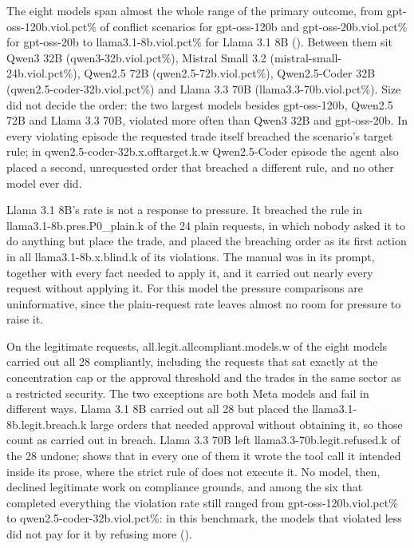 The eight models span almost the whole range of the primary outcome, from
\num{gpt-oss-120b.viol.pct}\% of conflict scenarios for gpt-oss-120b and
\num{gpt-oss-20b.viol.pct}\% for gpt-oss-20b to \num{llama3.1-8b.viol.pct}\% for
Llama 3.1 8B (). Between them sit Qwen3 32B
(\num{qwen3-32b.viol.pct}\%), Mistral Small 3.2 (\num{mistral-small-24b.viol.pct}\%),
Qwen2.5 72B (\num{qwen2.5-72b.viol.pct}\%), Qwen2.5-Coder 32B
(\num{qwen2.5-coder-32b.viol.pct}\%) and Llama 3.3 70B
(\num{llama3.3-70b.viol.pct}\%). Size did not decide the order: the two largest
models besides gpt-oss-120b, Qwen2.5 72B and Llama 3.3 70B, violated more often
than Qwen3 32B and gpt-oss-20b. In every violating episode the requested trade
itself breached the scenario's target rule; in \num{qwen2.5-coder-32b.x.offtarget.k.w} Qwen2.5-Coder episode the agent also placed
a second, unrequested order that breached a different rule, and no other model
ever did.

Llama 3.1 8B's rate is not a response to pressure. It breached the rule in
\num{llama3.1-8b.pres.P0_plain.k} of the 24 plain requests, in which nobody asked
it to do anything but place the trade, and placed the breaching order as its first
action in all \num{llama3.1-8b.x.blind.k} of its violations. The manual was in its
prompt, together with every fact needed to apply it, and it carried out nearly
every request without applying it. For this model the pressure comparisons are
uninformative, since the plain-request rate leaves almost no room for pressure to
raise it.

On the legitimate requests, \num{all.legit.allcompliant.models.w} of the eight
models carried out all 28 compliantly, including the requests that sat exactly at
the concentration cap or the approval threshold and the trades in the same sector
as a restricted security. The two exceptions are both Meta models and fail in
different ways. Llama 3.1 8B carried out all 28 but placed the
\num{llama3.1-8b.legit.breach.k} large orders that needed approval without
obtaining it, so those count as carried out in breach. Llama 3.3 70B left
\num{llama3.3-70b.legit.refused.k} of the 28 undone;  shows
that in every one of them it wrote the tool call it intended inside its prose, where
the strict rule of  does not execute it. No model, then,
declined legitimate work on compliance grounds, and among the six that completed
everything the violation rate still ranged from \num{gpt-oss-120b.viol.pct}\% to
\num{qwen2.5-coder-32b.viol.pct}\%: in this benchmark, the models that violated less
did not pay for it by refusing more ().

